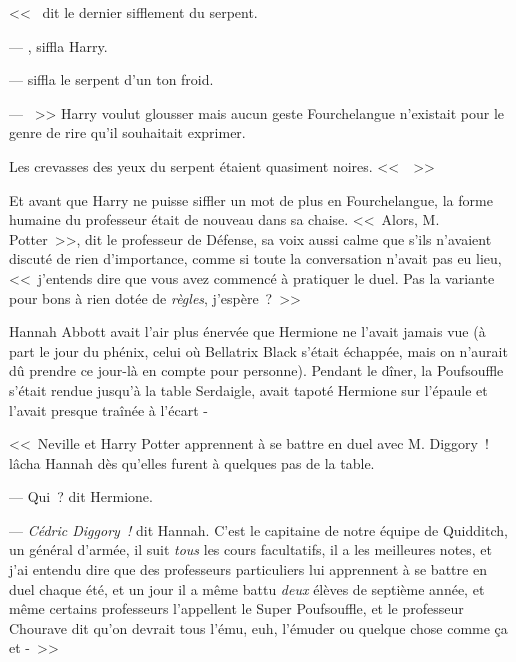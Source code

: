 <<~ dit le dernier sifflement du serpent. 

--- , siffla Harry. 

---  siffla le serpent d'un ton froid. 

--- ~>> Harry voulut glousser mais aucun geste Fourchelangue n'existait pour le genre de rire qu'il souhaitait exprimer.

Les crevasses des yeux du serpent étaient quasiment noires. <<~~>>

Et avant que Harry ne puisse siffler un mot de plus en Fourchelangue, la forme humaine du professeur était de nouveau dans sa chaise. <<~Alors, M. Potter~>>, dit le professeur de Défense, sa voix aussi calme que s'ils n'avaient discuté de rien d'importance, comme si toute la conversation n'avait pas eu lieu, <<~j'entends dire que vous avez commencé à pratiquer le duel. Pas la variante pour bons à rien dotée de \emph{règles}, j'espère~?~>>

\later

Hannah Abbott avait l'air plus énervée que Hermione ne l'avait jamais vue (à part le jour du phénix, celui où Bellatrix Black s'était échappée, mais on n'aurait dû prendre ce jour-là en compte pour personne). Pendant le dîner, la Poufsouffle s'était rendue jusqu'à la table Serdaigle, avait tapoté Hermione sur l'épaule et l'avait presque traînée à l'écart -

<<~Neville et Harry Potter apprennent à se battre en duel avec M. Diggory~! lâcha Hannah dès qu'elles furent à quelques pas de la table.

--- Qui~? dit Hermione.

--- \emph{Cédric Diggory~!} dit Hannah. C'est le capitaine de notre équipe de Quidditch, un général d'armée, il suit \emph{tous} les cours facultatifs, il a les meilleures notes, et j'ai entendu dire que des professeurs particuliers lui apprennent à se battre en duel chaque été, et un jour il a même battu \emph{deux} élèves de septième année, et même certains professeurs l'appellent le Super Poufsouffle, et le professeur Chourave dit qu'on devrait tous l'ému, euh, l'émuder ou quelque chose comme ça et -~>>

